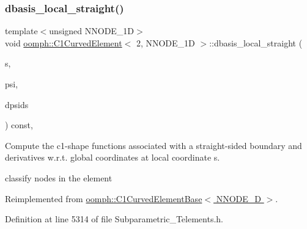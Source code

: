 \subsubsection{\texorpdfstring{dbasis\+\_\+local\+\_\+straight()}{dbasis\_local\_straight()}}
{\footnotesize\ttfamily template$<$unsigned N\+N\+O\+D\+E\+\_\+1D$>$ \\
void \hyperlink{classoomph_1_1C1CurvedElement}{oomph\+::\+C1\+Curved\+Element}$<$ 2, N\+N\+O\+D\+E\+\_\+1D $>$\+::dbasis\+\_\+local\+\_\+straight (\begin{DoxyParamCaption}\item[{const \hyperlink{classoomph_1_1Vector}{Vector}$<$ double $>$ \&}]{s,  }\item[{\hyperlink{classoomph_1_1Shape}{Shape} \&}]{psi,  }\item[{\hyperlink{classoomph_1_1DShape}{D\+Shape} \&}]{dpsids }\end{DoxyParamCaption}) const\hspace{0.3cm}{\ttfamily [inline]}, {\ttfamily [virtual]}}



Compute the c1-\/shape functions associated with a straight-\/sided boundary and derivatives w.\+r.\+t. global coordinates at local coordinate s. 

classify nodes in the element 

Reimplemented from \hyperlink{classoomph_1_1C1CurvedElementBase_a284de72597bf65588e53eb0b4516fa0b}{oomph\+::\+C1\+Curved\+Element\+Base$<$ N\+N\+O\+D\+E\+\_\+D $>$}.



Definition at line 5314 of file Subparametric\+\_\+\+Telements.\+h.

\mbox{\label{classoomph_1_1C1CurvedElement_3_012_00_01NNODE__1D_01_4_ad7457d81744bbb7596ce70f7d1b576ce}} 
